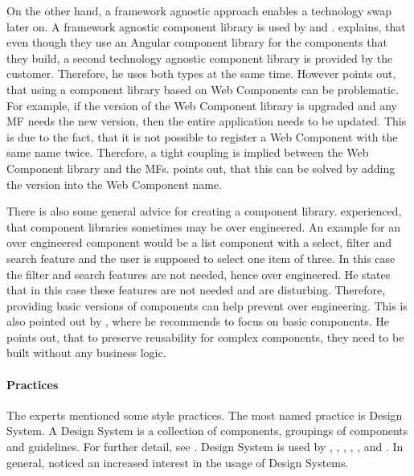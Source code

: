 On the other hand, a framework agnostic approach enables a technology swap later on.
A framework agnostic component library is used by \textciteOlleck{} and \textciteRehm{}.
\citeauthorRehm{} explains, that even though they use an Angular component library for the components that they build, a second technology agnostic component library is provided by the customer.
Therefore, he uses both types at the same time.
However \citeauthorOlleck{} points out, that using a component library based on Web Components can be problematic.
For example, if the version of the Web Component library is upgraded and any \ac{MF} needs the new version, then the entire application needs to be updated.
This is due to the fact, that it is not possible to register a Web Component with the same name twice.
Therefore, a tight coupling is implied between the Web Component library and the \acp{MF}.
\citeauthorOlleck{} points out, that this can be solved by adding the version into the Web Component name.

There is also some general advice for creating a component library.
\textcite{Laug.2018} experienced, that component libraries sometimes may be over engineered.
An example for an over engineered component would be a list component with a select, filter and search feature and the user is supposed to select one item of three.
In this case the filter and search features are not needed, hence over engineered.
He states that in this case these features are not needed and are disturbing.
Therefore, providing basic versions of components can help prevent over engineering.
This is also pointed out by \textcite{Jackson.2019}, where he recommends to focus on basic components.
He points out, that to preserve reusability for complex components, they need to be built without any business logic.



\paragraph{Practices}

The experts mentioned some style practices.
The most named practice is Design System.
A Design System is a collection of components, groupings of components and guidelines.
For further detail, see \cite[p.~16]{Vesselov.2019}.
Design System is used by \textciteRehm{}, \textciteOlleck{}, \textcite{Leitner.2020}, \textcite{Laug.2018}, \textcite{Grijzen.2019}, \textciteSteyer{} and \textciteHuber{}.
In general, \citeauthorSteyer{} noticed an increased interest in the usage of Design Systems.

